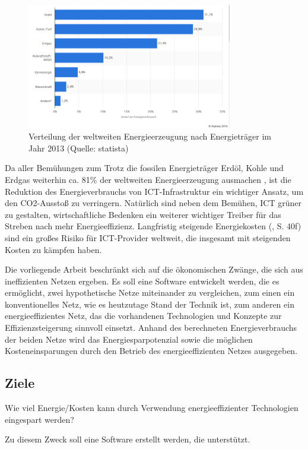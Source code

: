 \documentclass[12pt,titlepage]{article}
\begin{document}
\begin{figure}[!ht]
	\centering
	\includegraphics[width=0.8\textwidth]{statista}
	\caption{Verteilung der weltweiten Energieerzeugung nach Energieträger im Jahr 2013 (Quelle: statista)}
	\label{fig:statista}
\end{figure}

Da aller Bemühungen zum Trotz die fossilen Energieträger Erdöl, Kohle und Erdgas weiterhin ca. 81\% der weltweiten Energieerzeugung ausmachen \cite{statista}, ist die Reduktion des Energieverbrauchs von ICT-Infrastruktur ein wichtiger Ansatz, um den CO2-Ausstoß zu verringern. Natürlich sind neben dem Bemühen, ICT grüner zu gestalten, wirtschaftliche Bedenken ein weiterer wichtiger Treiber für das Streben nach mehr Energieeffizienz. Langfristig steigende Energiekosten (\cite{iea2015}, S. 40f) sind ein großes Risiko für ICT-Provider weltweit, die insgesamt mit steigenden Kosten zu kämpfen haben.

Die vorliegende Arbeit beschränkt sich auf die ökonomischen Zwänge, die sich aus ineffizienten Netzen ergeben. Es soll eine Software entwickelt werden, die es ermöglicht, zwei hypothetische Netze miteinander zu vergleichen, zum einen ein konventionelles Netz, wie es heutzutage Stand der Technik ist, zum anderen ein energieeffizientes Netz, das die vorhandenen Technologien und Konzepte zur Effizienzsteigerung sinnvoll einsetzt. Anhand des berechneten Energieverbrauchs der beiden Netze wird das Energiesparpotenzial sowie die möglichen Kosteneinsparungen durch den Betrieb des energieeffizienten Netzes ausgegeben.


\subsection{Ziele}
Wie viel Energie/Kosten kann durch Verwendung energieeffizienter Technologien eingespart werden? 

Zu diesem Zweck soll eine Software erstellt werden, die unterstützt.
\end{document}
